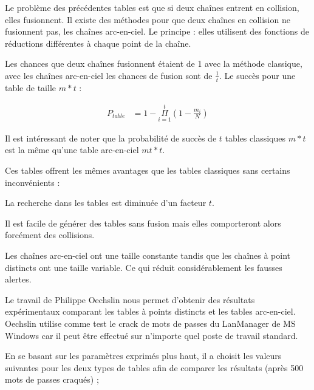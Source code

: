 

		Le problème des précédentes tables est que si deux chaînes entrent en collision, elles fusionnent. Il existe des méthodes pour que deux chaînes en collision ne fusionnent pas, les chaînes arc-en-ciel. Le principe : elles utilisent des fonctions de réductions différentes à chaque point de la chaîne.

		Les chances que deux chaînes fusionnent étaient de 1 avec la méthode classique\cite{Oech03}, avec les chaînes arc-en-ciel les chances de fusion sont de $\frac{1}{t}$. Le succès pour une table de taille $m*t$ :

		\begin{align*}
			P_{table} &= 1 - \overset{t}{\underset{i=1}{\Pi}}(1 - \frac{m_i}{N})
		\end{align*}

		Il est intéressant de noter que la probabilité de succès de $t$ tables classiques $m*t$ est la même qu'une table arc-en-ciel $mt*t$.

		\bigskip

		Ces tables offrent les mêmes avantages que les tables classiques sans certains inconvénients :
		\bi
			\item La recherche dans les tables est diminuée d'un facteur $t$.
			\item Il est facile de générer des tables sans fusion mais elles comporteront alors forcément des collisions.
			\item Les chaînes arc-en-ciel ont une taille constante tandis que les chaînes à point distincts ont une taille variable. Ce qui réduit considérablement les fausses alertes.
		\ei


		Le travail de Philippe Oechslin\cite{Oech03} nous permet d'obtenir des résultats expérimentaux comparant les tables à points distincts et les tables arc-en-ciel. Oechslin utilise comme test le crack de mots de passes du LanManager de MS Windows car il peut être effectué sur n'importe quel poste de travail standard.

		\bigskip

		En se basant sur les paramètres exprimés plus haut, il a choisit les valeurs suivantes pour les deux types de tables afin de comparer les résultats (après 500 mots de passes craqués) ;

		\bigskip

